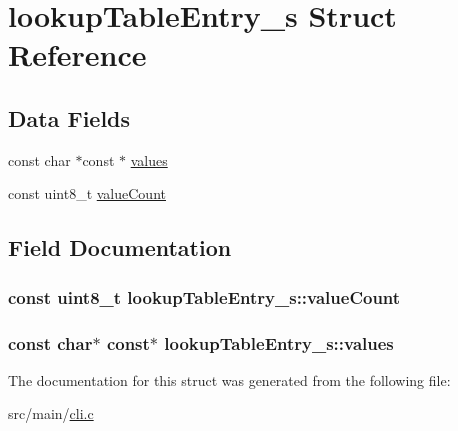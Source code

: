 \hypertarget{structlookupTableEntry__s}{\section{lookup\+Table\+Entry\+\_\+s Struct Reference}
\label{structlookupTableEntry__s}
}
\subsection*{Data Fields}
\begin{DoxyCompactItemize}
\item 
const char $\ast$const $\ast$ \hyperlink{structlookupTableEntry__s_a1396e9f0bdefb53aa4a822a6afae20af}{values}
\item 
const uint8\+\_\+t \hyperlink{structlookupTableEntry__s_a91ddec846c747b3f7e82c9e7983e3836}{value\+Count}
\end{DoxyCompactItemize}


\subsection{Field Documentation}
\hypertarget{structlookupTableEntry__s_a91ddec846c747b3f7e82c9e7983e3836}{
\subsubsection[{value\+Count}]{\setlength{\rightskip}{0pt plus 5cm}const uint8\+\_\+t lookup\+Table\+Entry\+\_\+s\+::value\+Count}}\label{structlookupTableEntry__s_a91ddec846c747b3f7e82c9e7983e3836}
\hypertarget{structlookupTableEntry__s_a1396e9f0bdefb53aa4a822a6afae20af}{
\subsubsection[{values}]{\setlength{\rightskip}{0pt plus 5cm}const char$\ast$ const$\ast$ lookup\+Table\+Entry\+\_\+s\+::values}}\label{structlookupTableEntry__s_a1396e9f0bdefb53aa4a822a6afae20af}


The documentation for this struct was generated from the following file\+:\begin{DoxyCompactItemize}
\item 
src/main/\hyperlink{cli_8c}{cli.\+c}\end{DoxyCompactItemize}
